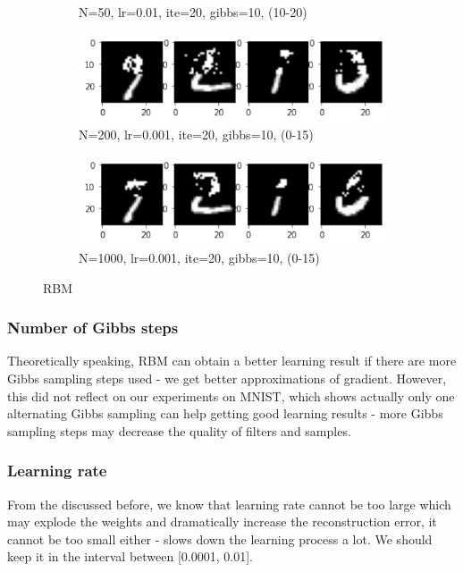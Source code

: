 \documentclass{article}
\begin{document}
\begin{figure}[h!]
\begin{subfigure}[b]{0.3\textwidth}
         \caption{N=50, lr=0.01, ite=20, gibbs=10, (10-20)}
         \label{fig:noise10ite10}
     \end{subfigure}
     \hfill
     \begin{subfigure}[b]{0.3\textwidth}
         \centering
         \includegraphics[width=\textwidth]{lab4/200_0.001_20_10_0-15.pdf}
         \caption{N=200, lr=0.001, ite=20, gibbs=10, (0-15)}
         \label{fig:noise10ite100}
     \end{subfigure}
     \hfill
     \begin{subfigure}[b]{0.3\textwidth}
         \centering
         \includegraphics[width=\textwidth]{lab4/1000_0.001_20_10_0-15.pdf}
         \caption{N=1000, lr=0.001, ite=20, gibbs=10, (0-15)}
         \label{fig:noise10ite500}
     \end{subfigure}
     
        \caption{RBM}
        \label{fig:rbm}
\end{figure}

\subsubsection{Number of Gibbs steps}
Theoretically speaking, RBM can obtain a better learning result if there are more Gibbs sampling steps used - we get better approximations of gradient. However, this did not reflect on our experiments on MNIST, which shows actually only one alternating Gibbs sampling can help getting good learning results - more Gibbs sampling steps may decrease the quality of filters and samples.

\subsubsection{Learning rate}
From the discussed before, we know that learning rate cannot be too large which may explode the weights and dramatically increase the reconstruction error, it cannot be too small either - slows down the learning process a lot. We should keep it in the interval between [0.0001, 0.01]. 
\end{document}
